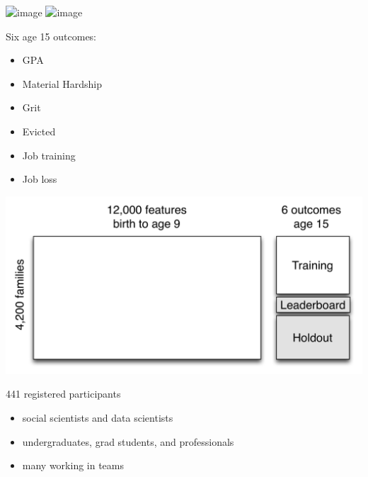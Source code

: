 \documentclass{beamer}
\begin{document}
\begin{frame}

\begin{center}
\includegraphics<1>[height=0.8\textheight]{figures/ff_design_public_b9}
\includegraphics<2>[height=0.8\textheight]{figures/ff_design_public2}
\end{center}

\end{frame}
\begin{frame}

Six age 15 outcomes:
\begin{itemize}
\item GPA
\item Material Hardship
\item Grit
\item Evicted
\item Job training
\item Job loss
\end{itemize}

\end{frame}
\begin{frame}

\begin{center}
\includegraphics[width=\textwidth]{figures/ffc_design_matrix_ml}
\end{center}

\end{frame}
\begin{frame}

441 registered participants
\begin{itemize}
\item social scientists and data scientists
\item undergraduates, grad students, and professionals
\item many working in teams
\end{itemize}

\end{frame}
\end{document}
